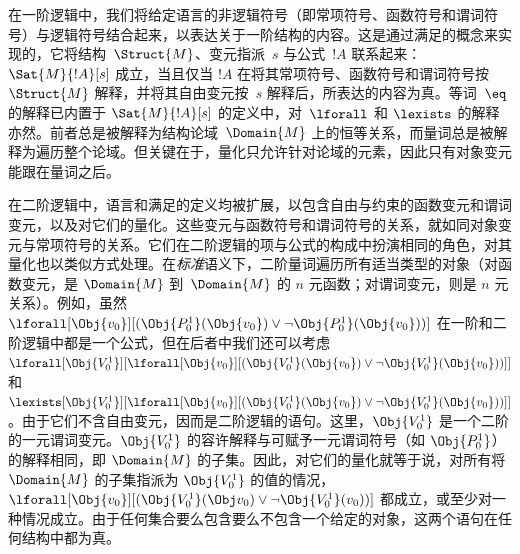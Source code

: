 \documentclass[../../../include/open-logic-section]{subfiles}
\begin{document}


在一阶逻辑中，我们将给定语言的非逻辑符号（即常项符号、函数符号和谓词符号）与逻辑符号结合起来，以表达关于一阶结构的内容。这是通过满足的概念来实现的，它将结构~$\Struct{M}$、变元指派~$s$ 与公式~$!A$ 联系起来：$\Sat{M}{!A}[s]$ 成立，当且仅当 $!A$ 在将其常项符号、函数符号和谓词符号按 $\Struct{M}$ 解释，并将其自由变元按~$s$ 解释后，所表达的内容为真。等词~$\eq$ 的解释已内置于 $\Sat{M}{!A}[s]$ 的定义中，对~$\lforall$ 和 $\lexists$ 的解释亦然。前者总是被解释为结构论域~$\Domain{M}$ 上的恒等关系，而量词总是被解释为遍历整个论域。但关键在于，量化只允许针对论域的元素，因此只有对象变元能跟在量词之后。

在二阶逻辑中，语言和满足的定义均被扩展，以包含自由与约束的函数变元和谓词变元，以及对它们的量化。这些变元与函数符号和谓词符号的关系，就如同对象变元与常项符号的关系。它们在二阶逻辑的项与公式的构成中扮演相同的角色，对其量化也以类似方式处理。在\emph{标准}语义下，二阶量词遍历所有适当类型的对象（对函数变元，是 $\Domain{M}$ 到~$\Domain{M}$ 的 $n$ 元函数；对谓词变元，则是 $n$ 元关系）。例如，虽然 $\lforall[\Obj{v_0}][(\Obj{P^1_0}(\Obj{v_0}) \lor \lnot
  \Obj{P^1_0}(\Obj{v_0}))]$ 在一阶和二阶逻辑中都是一个公式，但在后者中我们还可以考虑 $\lforall[\Obj{V^1_0}][\lforall[\Obj{v_0}][(\Obj{V^1_0}(\Obj{v_0}) \lor
    \lnot \Obj{V^1_0}(\Obj{v_0}))]]$ 和 $\lexists[\Obj{V^1_0}][\lforall[\Obj{v_0}][(\Obj{V^1_0}(\Obj{v_0}) \lor
    \lnot \Obj{V^1_0}(\Obj{v_0}))]]$。由于它们不含自由变元，因而是二阶逻辑的语句。这里，$\Obj{V^1_0}$ 是一个二阶的一元谓词变元。$\Obj{V^1_0}$ 的容许解释与可赋予一元谓词符号（如 $\Obj{P^1_0}$）的解释相同，即 $\Domain{M}$ 的子集。因此，对它们的量化就等于说，对所有将 $\Domain{M}$ 的子集指派为 $\Obj{V^1_0}$ 的值的情况，$\lforall[\Obj{v_0}][(\Obj{V^1_0}(\Obj v_0) \lor \lnot
  \Obj{V^1_0}(v_0))]$ 都成立，或至少对一种情况成立。由于任何集合要么包含要么不包含一个给定的对象，这两个语句在任何结构中都为真。
\end{document}
